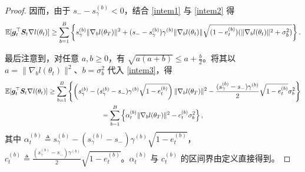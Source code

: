 \documentclass[11pt, a4paper, twocolumn, copyright, goog]{google}
\theoremstyle{plain}
\theoremstyle{definition}
\theoremstyle{remark}
\begin{document}
\begin{proof}
    因而，由于 $s_- - s_{\gamma}^{(b)} < 0$，结合 \eqref{intem1} 与 \eqref{intem2} 得 
    \begin{equation} \label{intem3}
        \mathbb{E} [{\bm{g}}_t^\top {\bm{S}}_t \nabla l(\theta_t)] \ge 
        \sum_{b=1}^{B} \left\lbrace s_{\gamma}^{(b)} \| \nabla_b l (\theta_T) \|^2  
        +  (s_- - s_{\gamma}^{(b)}) \gamma^{(b)} \| \nabla_b l(\theta_t) \| \sqrt{(1 - e_t^{(b)}) (\|\nabla_b l(\theta_t) \|^2 + \sigma^2_b)} \right\rbrace.
    \end{equation}
    
    最后注意到，对任意 $a, b\ge 0$，有 $ \sqrt{a (a+b)} \le a + \frac{b}{2}$。将其以 $a = \| \nabla_b l(\theta_t) \|^2$、$b = \sigma^2_b$ 代入 \eqref{intem3}，得 
    \begin{multline} \label{intem4}
        \mathbb{E} [{\bm{g}}_t^\top {\bm{S}}_t \nabla l(\theta_t)] \ge 
        \sum_{b=1}^{B} \left\lbrace 
            \left(s_{\gamma}^{(b)} - (s_{\gamma}^{(b)} - s_-) \gamma^{(b)} \sqrt{1 - e_t^{(b)}} \right) \| \nabla_b l (\theta_T) \|^2  
        -  \frac{(s_{\gamma}^{(b)} - s_-)\gamma^{(b)}}{2} \sqrt{1 - e_t^{(b)}}  \sigma^2_b \right\rbrace \\ 
        = \sum_{b=1}^{B} \left\lbrace 
            \alpha_t^{(b)} \| \nabla_b l (\theta_T) \|^2  
        -  c_t^{(b)}  \sigma^2_b \right\rbrace,
    \end{multline}
    其中 $\alpha_t^{(b)} \triangleq s_{\gamma}^{(b)} - (s_{\gamma}^{(b)} - s_-) \gamma^{(b)} \sqrt{1 - e_t^{(b)}}$，$c_t^{(b)} \triangleq \frac{(s_{\gamma}^{(b)} - s_-)\gamma^{(b)}}{2} \sqrt{1 - e_t^{(b)}}$。$\alpha_t^{(b)}$ 与 $c_t^{(b)}$ 的区间界由定义直接得到。 
    
\end{proof}
\end{document}
